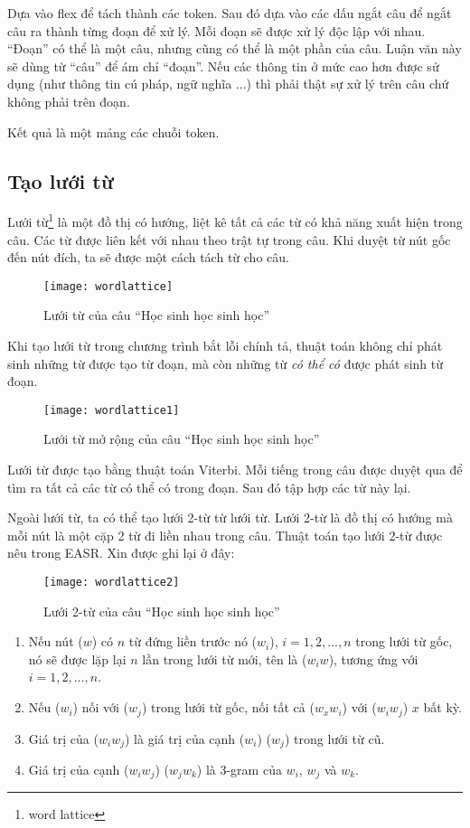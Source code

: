 \documentclass[a4paper]{book}
\begin{document}
Dựa vào flex để tách thành các token. Sau đó dựa vào các dấu ngắt câu
để ngắt câu ra thành từng đoạn để xử lý. Mỗi đoạn sẽ được xử lý độc
lập với nhau. ``Đoạn'' có thể là một câu, nhưng cũng có thể là một
phần của câu. Luận văn này sẽ dùng từ ``câu'' để ám chỉ ``đoạn''. Nếu
các thông tin ở mức cao hơn được sử dụng (như thông tin cú pháp, ngữ
nghĩa ...) thì phải thật sự xử lý trên câu chứ không phải trên
đoạn. 

Kết quả là một mảng các chuỗi token.


\subsection{Tạo lưới từ}
\label{sub:lattice}
Lưới từ\footnote{word lattice} là một đồ thị có hướng, liệt kê tất cả
các từ có khả năng xuất hiện trong câu. Các từ được liên kết với nhau
theo trật tự trong câu. Khi duyệt từ nút gốc đến nút đích, ta sẽ được
một cách tách từ cho câu.

\begin{figure}[htbp]
  \centering
  \texttt{[image: wordlattice]}
  \caption{Lưới từ của câu ``Học sinh học sinh học''}
  \label{fig:wordlattice}
\end{figure}

Khi tạo lưới từ trong chương trình bắt lỗi chính tả, thuật toán không
chỉ phát sinh những từ được tạo từ đoạn, mà còn những từ {\em có thể
có} được phát sinh từ đoạn.

\begin{figure}[htbp]
  \centering
  \texttt{[image: wordlattice1]}
  \caption{Lưới từ mở rộng của câu ``Học sinh học sinh học''}
  \label{fig:wordlattice1}
\end{figure}

Lưới từ được tạo bằng thuật toán Viterbi. Mỗi tiếng trong câu được
duyệt qua để tìm ra tất cả các từ có thể có trong đoạn. Sau đó tập hợp
các từ này lại. 

Ngoài lưới từ, ta có thể tạo lưới 2-từ từ lưới từ. Lưới 2-từ là đồ thị
có hướng mà mỗi nút là một cặp 2 từ đi liền nhau trong câu. Thuật toán
tạo lưới 2-từ được nêu trong EASR. Xin được ghi lại ở đây:

\begin{figure}[htbp]
  \centering
  \texttt{[image: wordlattice2]}
  \caption{Lưới 2-từ của câu ``Học sinh học sinh học''}
  \label{fig:wordlattice2}
\end{figure}

\begin{enumerate}
\item Nếu nút ($w$) có $n$ từ đứng liền trước nó ($w_i$),
  $i=1,2,\ldots,n$ trong lưới từ gốc, nó sẽ được lặp lại $n$ lần trong
  lưới từ mới, tên là ($w_{i}w$), tương ứng với $i=1,2,\ldots,n$.
\item Nếu ($w_i$) nối với ($w_j$) trong lưới từ gốc, nối tất cả
  ($w_xw_i$) với ($w_iw_j$) $x$ bất kỳ.
\item Giá trị của ($w_iw_j$) là giá trị của cạnh ($w_i$) ($w_j$) trong
  lưới từ cũ.
\item Giá trị của cạnh ($w_iw_j$) ($w_jw_k$) là 3-gram của $w_i$, $w_j$
  và $w_k$.
\end{enumerate}
\end{document}
